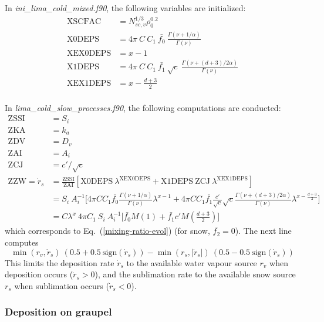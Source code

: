 {In \emph{ini\_lima\_cold\_mixed.f90}, the following variables are initialized:
\begin{align}
 \mathrm{XSCFAC} &= N_{sc,v}^{1/3} \rho_0^{0.2} \\
 \mathrm{X0DEPS} &= 4 \pi ~ C ~ C_1 ~ \bar{f_0} ~ \frac{\Gamma(\nu+1/\alpha)}{\Gamma(\nu)} \\
 \mathrm{XEX0DEPS} &= x-1 \\
 \mathrm{X1DEPS} &= 4 \pi ~ C ~ C_1 ~ \bar{f_1} ~ \sqrt{c} ~ \frac{\Gamma(\nu+(d+3)/2\alpha)}{\Gamma(\nu)} \\
 \mathrm{XEX1DEPS} &= x-\frac{d+3}{2} \\
\end{align}

In \emph{lima\_cold\_slow\_processes.f90}, the following computations are conducted:
\begin{align}
 \mathrm{ZSSI} &= S_i \\
 \mathrm{ZKA} &= k_a \\
 \mathrm{ZDV} &= D_v \\
 \mathrm{ZAI} &= A_i \\
 \mathrm{ZCJ} &= c'/\sqrt{c} \\
 \mathrm{ZZW} = \dot{r}_s &= \frac{\mathrm{ZSSI}}{\mathrm{ZAI}} [\mathrm{X0DEPS} ~ \lambda^{\mathrm{XEX0DEPS}} + \mathrm{X1DEPS} ~ \mathrm{ZCJ} ~ \lambda^{\mathrm{XEX1DEPS}}]  \\
 &= S_i~A_i^{-1} \bigg[ 4 \pi C C_1 \bar{f_0} \frac{\Gamma(\nu+1/\alpha)}{\Gamma(\nu)} \lambda^{x-1} + 4 \pi C C_1 \bar{f_1} \frac{c'}{\sqrt{c}} \sqrt{c} \frac{\Gamma(\nu+(d+3)/2\alpha)}{\Gamma(\nu)} \lambda^{x-\frac{d+3}{2}} \bigg] \\
 &= C \lambda^x ~ 4 \pi C_1 ~ S_i ~ A_i^{-1} \bigg[ \bar{f_0} M(1) + \bar{f_1} c' M(\frac{d+3}{2}) \bigg]
 \end{align}
which corresponds to Eq.\ (\ref{mixing-ratio-evol}) (for snow, $\bar{f_2}=0$). The next line computes
\begin{equation}
 \min(r_v,\dot{r}_s)~(0.5+0.5~\mathrm{sign}(\dot{r}_s)) - \min(r_s,|\dot{r}_s|)~(0.5-0.5~\mathrm{sign}(\dot{r}_s))
\end{equation}
This limits the deposition rate $\dot{r}_s$ to the available water vapour source $r_v$ when deposition occurs ($\dot{r}_s > 0$), and the sublimation rate to the available snow source $r_s$ when sublimation occurs ($\dot{r}_s < 0$).

\subsubsection{Deposition on graupel}

}

